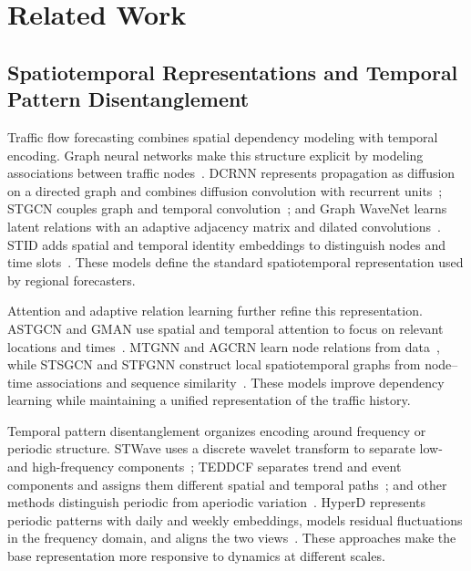 
\section{Related Work}\label{sec:related-work}

\subsection{Spatiotemporal Representations and Temporal Pattern Disentanglement}\label{sec:frequency-related}

Traffic flow forecasting combines spatial dependency modeling with temporal encoding. Graph neural networks make this structure explicit by modeling associations between traffic nodes~\cite{ref29}. DCRNN represents propagation as diffusion on a directed graph and combines diffusion convolution with recurrent units~\cite{ref01}; STGCN couples graph and temporal convolution~\cite{ref02}; and Graph WaveNet learns latent relations with an adaptive adjacency matrix and dilated convolutions~\cite{ref03}. STID adds spatial and temporal identity embeddings to distinguish nodes and time slots~\cite{ref28}. These models define the standard spatiotemporal representation used by regional forecasters.

Attention and adaptive relation learning further refine this representation. ASTGCN and GMAN use spatial and temporal attention to focus on relevant locations and times~\cite{ref04,ref05}. MTGNN and AGCRN learn node relations from data~\cite{ref06,ref07}, while STSGCN and STFGNN construct local spatiotemporal graphs from node--time associations and sequence similarity~\cite{ref08,ref09}. These models improve dependency learning while maintaining a unified representation of the traffic history.

Temporal pattern disentanglement organizes encoding around frequency or periodic structure. STWave uses a discrete wavelet transform to separate low- and high-frequency components~\cite{ref11}; TEDDCF separates trend and event components and assigns them different spatial and temporal paths~\cite{ref18}; and other methods distinguish periodic from aperiodic variation~\cite{ref37}. HyperD represents periodic patterns with daily and weekly embeddings, models residual fluctuations in the frequency domain, and aligns the two views~\cite{ref22}. These approaches make the base representation more responsive to dynamics at different scales.

